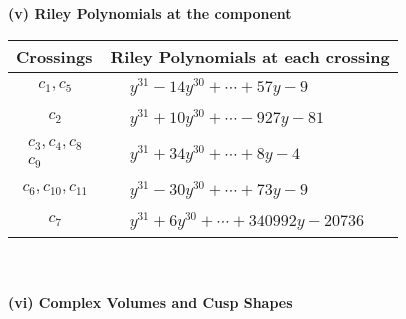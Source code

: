 \documentclass[1p]{elsarticle_modified}
\theoremstyle{definition}
\begin{document}
\newpage\renewcommand{\arraystretch}{1}
\flushleft \textbf{(v) Riley Polynomials at the component}\newline \\
\begin{tabular}{m{50pt}|m{274pt}}
Crossings & \hspace{64pt}Riley Polynomials at each crossing \\
\hline $$\begin{aligned}c_{1},c_{5}\end{aligned}$$&$\begin{aligned}
&y^{31}-14 y^{30}+\cdots+57 y-9
\end{aligned}$\\
\hline $$\begin{aligned}c_{2}\end{aligned}$$&$\begin{aligned}
&y^{31}+10 y^{30}+\cdots-927 y-81
\end{aligned}$\\
\hline $$\begin{aligned}c_{3},c_{4},c_{8}\\c_{9}\end{aligned}$$&$\begin{aligned}
&y^{31}+34 y^{30}+\cdots+8 y-4
\end{aligned}$\\
\hline $$\begin{aligned}c_{6},c_{10},c_{11}\end{aligned}$$&$\begin{aligned}
&y^{31}-30 y^{30}+\cdots+73 y-9
\end{aligned}$\\
\hline $$\begin{aligned}c_{7}\end{aligned}$$&$\begin{aligned}
&y^{31}+6 y^{30}+\cdots+340992 y-20736
\end{aligned}$\\
\hline
\end{tabular}\\~\\
\newpage\flushleft \textbf{(vi) Complex Volumes and Cusp Shapes}
\end{document}
